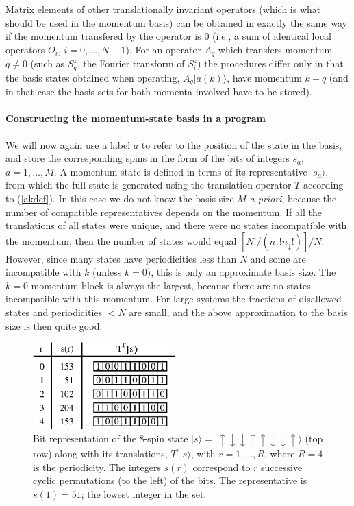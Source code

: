 \documentclass[draft,numberedheadings]{aipproc}
\newcommand{\dn}{\downarrow}
\newcommand{\up}{\uparrow}
\begin{document}
Matrix elements of other translationally invariant operators (which is what should be used in the momentum basis) can be obtained in exactly the same way if the
momentum transfered by the operator is $0$ (i.e., a sum of identical local operators $O_i$, $i=0,\ldots,N-1$). For an operator $A_q$ which transfers momentum 
$q \not =0$ (such as $S^z_q$, the Fourier transform of $S^z_i$) the procedures differ only in that the basis states obtained when operating, $A_q|a(k)\rangle$, 
have momentum $k+q$ (and in that case the basis sets for both momenta involved have to be stored).

\paragraph{Constructing the momentum-state basis in a program}

We will now again use a label $a$ to refer to the position of the state in the basis, and store the corresponding spins in the form of the bits
of integers $s_a$, $a=1,\ldots,M$. A momentum state is defined in terms of its representative $|s_a\rangle$, from which the full 
state is generated using the translation operator $T$ according to (\ref{akdef}). In this case we do not know the basis size $M$ {\it a priori}, 
because the number of compatible representatives depends on the momentum. If all the translations of all states were unique, and there were no states 
incompatible with the momentum, then the number of states would equal $[N!/(n_\up!n_\dn!)]/N$. However, since many states have periodicities less than 
$N$ and some are incompatible with $k$ (unless $k=0$), this is only an approximate basis size. The $k=0$ momentum block is always the largest, because 
there are no states incompatible with this momentum. For large systems the fractions of disallowed states and periodicities $<N$ are small, 
and the above approximation to the basis size is then quite good. 

\begin{figure}
\includegraphics[width=5.5cm, clip]{bitstates2.eps}
\caption{Bit representation of the 8-spin state $|s\rangle = |\up\dn\dn\up\up\dn\dn\up\rangle$ (top row) along with its translations, 
$T^r|s\rangle$, with $r=1,\ldots,R$, where $R=4$ is the periodicity. The integers $s(r)$ correspond to $r$ successive cyclic permutations 
(to the left) of the bits. The representative is $s(1)=51$; the lowest integer in the set.}
\label{bitstates2}
\end{figure}
\end{document}

